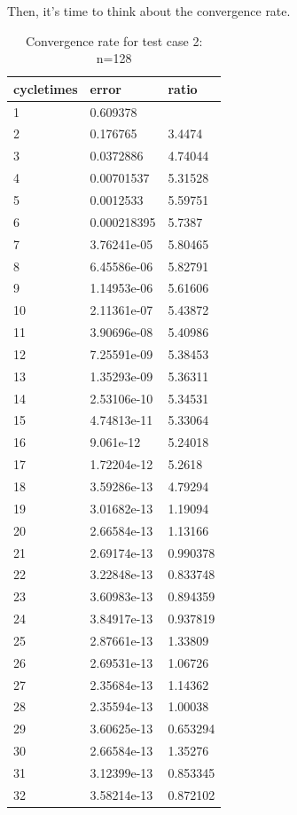 \documentclass[UTF8]{ctexart}
\theoremstyle{plain}
\theoremstyle{definition}
\theoremstyle{remark}
\begin{document}
Then, it's time to think about the convergence rate.
\begin{table}[H]
\centering
\begin{tabular}{|l|l|l|}
\hline
cycletimes & error & ratio\\\hline
1 & 0.609378&\\ \hline
2 & 0.176765& 3.4474\\ \hline
3 & 0.0372886& 4.74044\\ \hline
4 & 0.00701537& 5.31528\\ \hline
5 & 0.0012533& 5.59751\\ \hline
6 & 0.000218395& 5.7387\\ \hline
7 & 3.76241e-05& 5.80465\\ \hline
8 & 6.45586e-06& 5.82791\\ \hline
9 & 1.14953e-06& 5.61606\\ \hline
10 & 2.11361e-07& 5.43872\\ \hline
11 & 3.90696e-08& 5.40986\\ \hline
12 & 7.25591e-09& 5.38453\\ \hline
13 & 1.35293e-09& 5.36311\\ \hline
14 & 2.53106e-10& 5.34531\\ \hline
15 & 4.74813e-11& 5.33064\\ \hline
16 & 9.061e-12& 5.24018\\ \hline
17 & 1.72204e-12& 5.2618\\ \hline
18 & 3.59286e-13& 4.79294\\ \hline
19 & 3.01682e-13& 1.19094\\ \hline
20 & 2.66584e-13& 1.13166\\ \hline
21 & 2.69174e-13& 0.990378\\ \hline
22 & 3.22848e-13& 0.833748\\ \hline
23 & 3.60983e-13& 0.894359\\ \hline
24 & 3.84917e-13& 0.937819\\ \hline
25 & 2.87661e-13& 1.33809\\ \hline
26 & 2.69531e-13& 1.06726\\ \hline
27 & 2.35684e-13& 1.14362\\ \hline
28 & 2.35594e-13& 1.00038\\ \hline
29 & 3.60625e-13& 0.653294\\ \hline
30 & 2.66584e-13& 1.35276\\ \hline
31 & 3.12399e-13& 0.853345\\ \hline
32 & 3.58214e-13& 0.872102\\ \hline
\end{tabular}
\caption{Convergence rate for test case 2: n=128}
\end{table}
\end{document}
